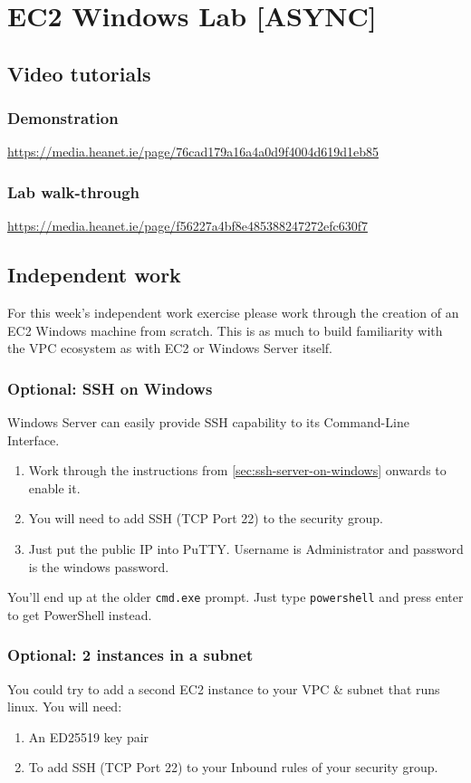 \chapter{EC2 Windows Lab [ASYNC]}
\label{ch:ec2-windows-lab-async}

\section{Video tutorials}

\subsection{Demonstration}
\url{https://media.heanet.ie/page/76cad179a16a4a0d9f4004d619d1eb85}

\subsection{Lab walk-through}
\url{https://media.heanet.ie/page/f56227a4bf8e485388247272efc630f7}

\section{Independent work}

For this week's independent work exercise please work through the creation of an EC2 Windows machine from scratch.
This is as much to build familiarity with the VPC ecosystem as with EC2 or Windows Server itself.

\subsection{Optional: SSH on Windows}

Windows Server can easily provide SSH capability to its Command-Line Interface.
\begin{enumerate}
\item Work through the instructions from \autoref{sec:ssh-server-on-windows} onwards to enable it.
\item You will need to add SSH (TCP Port 22) to the security group.
\item Just put the public IP into PuTTY. Username is Administrator and password is the windows password.
\end{enumerate}
You'll end up at the older \texttt{cmd.exe} prompt.
Just type \texttt{powershell} and press enter to get PowerShell instead.

\subsection{Optional: 2 instances in a subnet}

You could try to add a second EC2 instance to your VPC \& subnet that runs linux.
You will need:
\begin{enumerate}
\item An ED25519 key pair
\item To add SSH (TCP Port 22) to your Inbound rules of your security group. 
\end{enumerate}

